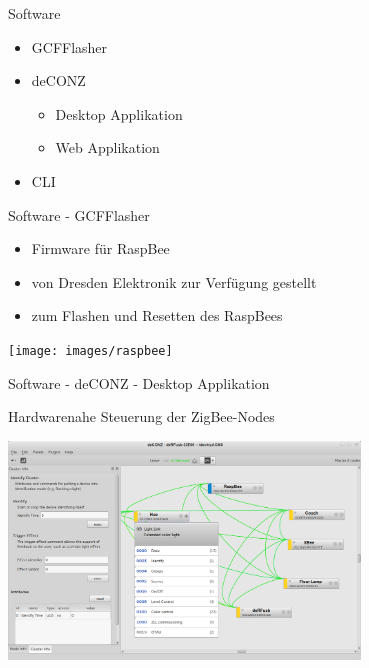 \begin{frame}{Software}
  \begin{itemize}
	\item GCFFlasher
	\item deCONZ
    \begin{itemize}
      \item Desktop Applikation
      \item Web Applikation
    \end{itemize}
	\item CLI
  \end{itemize}
\end{frame}

\begin{frame}{Software - GCFFlasher}

  \begin{itemize}
	\item Firmware für RaspBee
	\item von Dresden Elektronik zur Verfügung gestellt
	\item zum Flashen und Resetten des RaspBees
  \end{itemize}

  \begin{center}
    \texttt{[image: images/raspbee]}
  \end{center}
\end{frame}

\begin{frame}{Software - deCONZ - Desktop Applikation}

Hardwarenahe Steuerung der ZigBee-Nodes

  \begin{center}
    \includegraphics[width=0.7\textwidth]{images/deconz_app}
  \end{center}
\end{frame}

